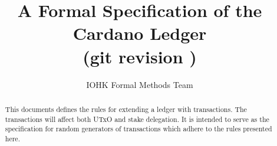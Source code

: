 
\title{A Formal Specification of the Cardano Ledger \\
       {\small (git revision \gitFirstTagDescribe)}}

\author{IOHK Formal Methods Team}


\maketitle

\begin{abstract}
This documents defines the rules for extending a ledger with transactions.
The transactions will affect both UTxO and stake delegation.
It is intended to serve as the specification for random generators of transactions
which adhere to the rules presented here.
\end{abstract}

